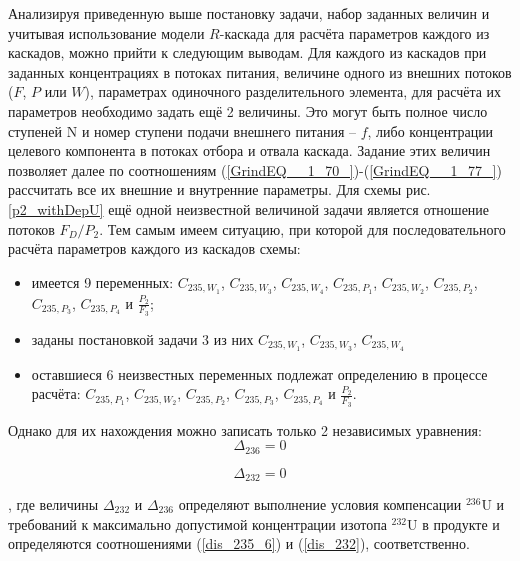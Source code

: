 Анализируя приведенную выше постановку задачи, набор заданных величин и учитывая использование модели $R$-каскада для расчёта параметров каждого из каскадов, можно прийти к следующим выводам. Для каждого из каскадов при заданных концентрациях в потоках питания, величине одного из внешних потоков ($F$, $P$ или $W$), параметрах одиночного разделительного элемента, для расчёта их параметров необходимо задать ещё 2 величины. Это могут быть полное число ступеней N и номер ступени подачи внешнего питания -- $f$, либо концентрации целевого компонента в потоках отбора и отвала каскада. Задание этих величин позволяет далее по соотношениям (\ref{GrindEQ__1_70_})-(\ref{GrindEQ__1_77_}) рассчитать все их внешние и внутренние параметры. Для схемы рис. \ref{p2_withDepU} ещё одной неизвестной величиной задачи является отношение потоков ${F_{D}}/{P_2}$. Тем самым имеем ситуацию, при которой для последовательного расчёта параметров каждого из каскадов схемы:
\begin{itemize}
    \item имеется 9 переменных: $C_{235,{W_1}}$, $C_{235,{W_3}}$, $C_{235,{W_4}}$, $C_{235,{P_1}}$, $C_{235,{W_2}}$, $C_{235,{P_2}}$,  $C_{235,{P_3}}$,  $C_{235,{P_4}}$ и $\frac{P_{2}}{F_3}$;
    \item заданы постановкой задачи 3 из них $C_{235,{W_1}}$, $C_{235,{W_3}}$, $C_{235,{W_4}}$
    \item оставшиеся 6 неизвестных переменных подлежат определению в процессе расчёта: $C_{235,{P_1}}$, $C_{235,{W_2}}$, $C_{235,{P_2}}$,  $C_{235,{P_3}}$, $C_{235,{P_4}}$ и $\frac{P_{2}}{F_3}$. 
\end{itemize}

Однако для их нахождения можно записать только 2 независимых уравнения:
\begin{equation}
    \label{dis_235_6_triple}
    \Delta_{236}=0
\end{equation}

\begin{equation}
    \label{dis_232_triple}
    \Delta_{232}=0
\end{equation}

, где величины $\Delta_{232}$ и $\Delta_{236}$ определяют выполнение условия компенсации $^{236}$U и требований к максимально допустимой концентрации изотопа $^{232}$U в продукте и определяются соотношениями (\ref{dis_235_6}) и (\ref{dis_232}), соответственно.

